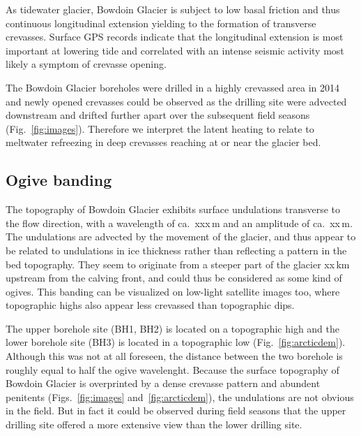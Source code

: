 \documentclass[utf8]{article}
\begin{document}
    As tidewater glacier, Bowdoin Glacier is subject to low basal friction and
    thus continuous longitudinal extension yielding to the formation of
    transverse crevasses. Surface GPS records indicate that the longitudinal
    extension is most important at lowering tide and correlated with an intense
    seismic activity most likely a symptom of crevasse opening.

    The Bowdoin Glacier boreholes were drilled in a highly crevassed area in
    2014 and newly opened crevasses could be observed as the drilling site were
    advected downstream and drifted further apart over the subsequent field
    seasons (Fig.~\ref{fig:images}). Therefore we interpret the latent heating
    to relate to meltwater
    refreezing in deep crevasses reaching at or near the glacier bed.


\subsection{Ogive banding}

    The topography of Bowdoin Glacier exhibits surface undulations transverse
    to the flow direction, with a wavelength of ca.~xxx\,m and an amplitude of
    ca.~xx\,m. The undulations are advected by the movement of the glacier, and
    thus appear to be related to undulations in ice thickness rather than
    reflecting a pattern in the bed topography. They seem to originate from a
    steeper part of the glacier xx\,km upstream from the calving front, and
    could thus be considered as some kind of ogives. This banding can be
    visualized on low-light satellite images too, where topographic highs also
    appear less crevassed than topographic dips.

    The upper borehole site (BH1, BH2) is located on a topographic high and the
    lower borehole site (BH3) is located in a topographic low
    (Fig.~\ref{fig:arcticdem}). Although this
    was not at all foreseen, the distance between the two borehole is roughly
    equal to half the ogive wavelenght. Because the surface topography of
    Bowdoin Glacier is overprinted by a dense crevasse pattern and abundent
    penitents (Figs.~\ref{fig:images} and~\ref{fig:arcticdem}), the undulations
    are not obvious in the field.  But in fact it
    could be observed during field seasons that the upper drilling site offered
    a more extensive view than the lower drilling site.
\end{document}
